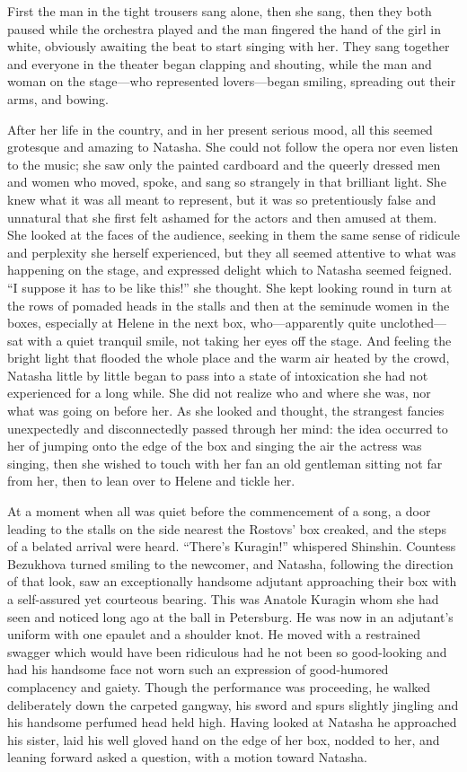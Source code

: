 First the man in the tight trousers sang alone, then she sang,
then they both paused while the orchestra played and the man
fingered the hand of the girl in white, obviously awaiting the
beat to start singing with her. They sang together and everyone
in the theater began clapping and shouting, while the man and
woman on the stage---who represented lovers---began smiling,
spreading out their arms, and bowing.

After her life in the country, and in her present serious mood,
all this seemed grotesque and amazing to Natasha. She could not
follow the opera nor even listen to the music; she saw only the
painted cardboard and the queerly dressed men and women who
moved, spoke, and sang so strangely in that brilliant light. She
knew what it was all meant to represent, but it was so
pretentiously false and unnatural that she first felt ashamed for
the actors and then amused at them. She looked at the faces of
the audience, seeking in them the same sense of ridicule and
perplexity she herself experienced, but they all seemed attentive
to what was happening on the stage, and expressed delight which
to Natasha seemed feigned. ``I suppose it has to be like this!''
she thought. She kept looking round in turn at the rows of
pomaded heads in the stalls and then at the seminude women in the
boxes, especially at Helene in the next box, who---apparently
quite unclothed---sat with a quiet tranquil smile, not taking her
eyes off the stage. And feeling the bright light that flooded the
whole place and the warm air heated by the crowd, Natasha little
by little began to pass into a state of intoxication she had not
experienced for a long while. She did not realize who and where
she was, nor what was going on before her. As she looked and
thought, the strangest fancies unexpectedly and disconnectedly
passed through her mind: the idea occurred to her of jumping onto
the edge of the box and singing the air the actress was singing,
then she wished to touch with her fan an old gentleman sitting
not far from her, then to lean over to Helene and tickle her.

At a moment when all was quiet before the commencement of a song,
a door leading to the stalls on the side nearest the Rostovs' box
creaked, and the steps of a belated arrival were heard. ``There's
Kuragin!'' whispered Shinshin. Countess Bezukhova turned smiling
to the newcomer, and Natasha, following the direction of that
look, saw an exceptionally handsome adjutant approaching their
box with a self-assured yet courteous bearing. This was Anatole
Kuragin whom she had seen and noticed long ago at the ball in
Petersburg. He was now in an adjutant's uniform with one epaulet
and a shoulder knot. He moved with a restrained swagger which
would have been ridiculous had he not been so good-looking and
had his handsome face not worn such an expression of good-humored
complacency and gaiety. Though the performance was proceeding, he
walked deliberately down the carpeted gangway, his sword and
spurs slightly jingling and his handsome perfumed head held
high. Having looked at Natasha he approached his sister, laid his
well gloved hand on the edge of her box, nodded to her, and
leaning forward asked a question, with a motion toward Natasha.

